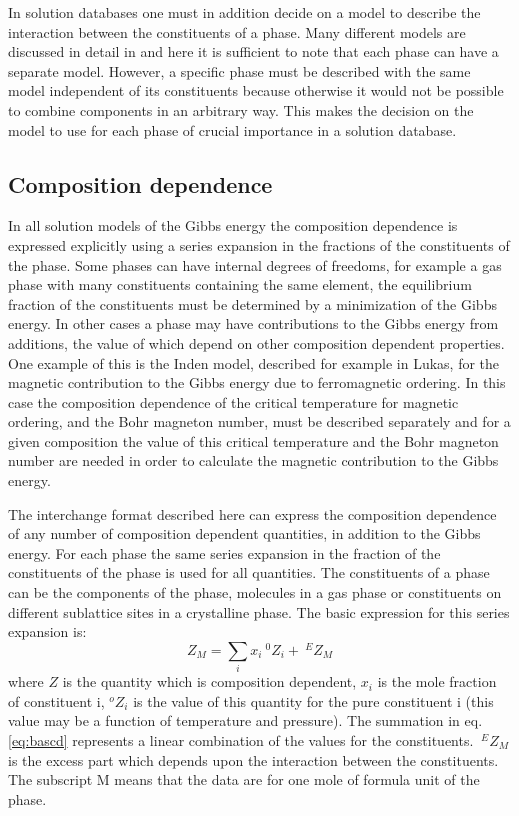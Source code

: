 \documentclass[12pt]{article}
\begin{document}
In solution databases one must in addition decide on a model to
describe the interaction between the constituents of a phase.  Many
different models are discussed in detail in \cite{07Luk} and here it
is sufficient to note that each phase can have a separate model.
However, a specific phase must be described with the same model
independent of its constituents because otherwise it would not be
possible to combine components in an arbitrary way.  This makes the
decision on the model to use for each phase of crucial importance in a
solution database.

\subsection{Composition dependence}\label{sec:tpdep}

In all solution models of the Gibbs energy the composition dependence
is expressed explicitly using a series expansion in the fractions of
the constituents of the phase.  Some phases can have internal degrees
of freedoms, for example a gas phase with many constituents containing
the same element, the equilibrium fraction of the constituents must be
determined by a minimization of the Gibbs energy.  In other cases a
phase may have contributions to the Gibbs energy from additions, the
value of which depend on other composition dependent properties.  One
example of this is the Inden model, described for example in
Lukas\cite{07Luk}, for the magnetic contribution to the Gibbs energy
due to ferromagnetic ordering.  In this case the composition
dependence of the critical temperature for magnetic ordering, and the
Bohr magneton number, must be described separately and for a given
composition the value of this critical temperature and the Bohr
magneton number are needed in order to calculate the magnetic
contribution to the Gibbs energy.

The interchange format described here can express the composition
dependence of any number of composition dependent quantities, in
addition to the Gibbs energy.  For each phase the same series
expansion in the fraction of the constituents of the phase is used for
all quantities.  The constituents of a phase can be the components of
the phase, molecules in a gas phase or constituents on different
sublattice sites in a crystalline phase.  The basic expression for
this series expansion is:
\begin{equation}
Z_M = \sum_i x_i ~^0Z_i + ~^EZ_M \label{eq:bascd}
\end{equation}
where $Z$ is the quantity which is composition dependent, $x_i$ is the
mole fraction of constituent i, $^oZ_i$ is the value of this quantity
for the pure constituent i (this value may be a function of
temperature and pressure).  The summation in eq.  \ref{eq:bascd}
represents a linear combination of the values for the constituents.
$~^EZ_M$ is the excess part which depends upon the interaction between
the constituents.  The subscript M means that the data are for one
mole of formula unit of the phase.
\end{document}

